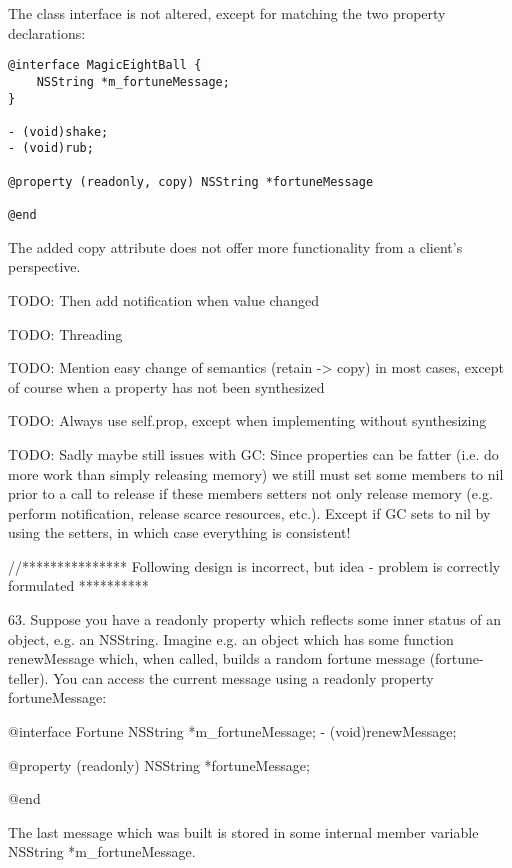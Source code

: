 The class interface is not altered, except for matching the two property declarations:
\begin{lstlisting}[frame=single, caption={MagicEightBall.h}]
@interface MagicEightBall {
    NSString *m_fortuneMessage;
}

- (void)shake;
- (void)rub;

@property (readonly, copy) NSString *fortuneMessage

@end
\end{lstlisting}
The added copy attribute does not offer more functionality from a client's perspective.




TODO: Then add notification when value changed

TODO: Threading

TODO: Mention easy change of semantics (retain -> copy) in most cases, except of course when a property has not been synthesized

TODO: Always use self.prop, except when implementing without synthesizing

TODO: Sadly maybe still issues with GC: Since properties can be fatter (i.e. do more work than simply releasing memory) we still must set some members to nil prior to a call to release if these members setters not only release memory (e.g. perform notification, release scarce resources, etc.). Except if GC sets to nil by using the setters, in which case everything is consistent!









//*************** Following design is incorrect, but idea - problem is correctly formulated **********

63. Suppose you have a readonly property which reflects some inner status of
an object, e.g. an NSString. Imagine e.g. an object which has some function
renewMessage which, when called, builds a random fortune message
(fortune-teller). You can access the current message using a readonly
property fortuneMessage:

@interface Fortune {
   NSString *m_fortuneMessage;
}
- (void)renewMessage;

@property (readonly) NSString *fortuneMessage;

@end

The last message which was built is stored in some internal member variable
NSString *m_fortuneMessage.

